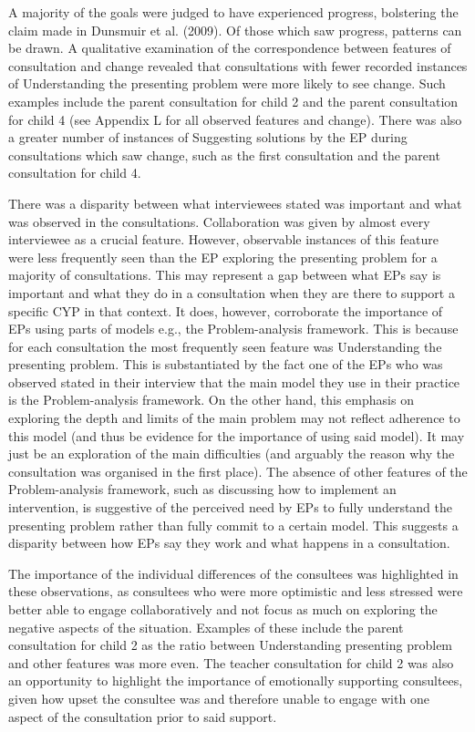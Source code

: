 \documentclass[
  english,
  man,floatsintext]{apa6}
\begin{document}
A majority of the goals were judged to have experienced progress,
bolstering the claim made in Dunsmuir et al. (2009). Of
those which saw progress, patterns can be drawn. A qualitative
examination of the correspondence between features of consultation and
change revealed that consultations with fewer recorded instances of
Understanding the presenting problem were more likely to see change.
Such examples include the parent consultation for child 2 and the parent
consultation for child 4 (see Appendix L for all observed features and
change). There was also a greater number of instances of Suggesting
solutions by the EP during consultations which saw change, such as the
first consultation and the parent consultation for child 4.

There was a disparity between what interviewees stated was important and
what was observed in the consultations. Collaboration was given by
almost every interviewee as a crucial feature. However, observable
instances of this feature were less frequently seen than the EP
exploring the presenting problem for a majority of consultations. This
may represent a gap between what EPs say is important and what they
do in a consultation when they are there to support a specific
CYP in that context. It does, however, corroborate the importance of EPs
using parts of models e.g., the Problem-analysis framework. This is
because for each consultation the most frequently seen feature was
Understanding the presenting problem. This is substantiated by the fact
one of the EPs who was observed stated in their interview that the main
model they use in their practice is the Problem-analysis framework. On
the other hand, this emphasis on exploring the depth and limits of the
main problem may not reflect adherence to this model (and thus be
evidence for the importance of using said model). It may just be an
exploration of the main difficulties (and arguably the reason why the
consultation was organised in the first place). The absence of other
features of the Problem-analysis framework, such as discussing how to
implement an intervention, is suggestive of the perceived need by EPs to
fully understand the presenting problem rather than fully commit to a
certain model. This suggests a disparity between how EPs say they work
and what happens in a consultation.

The importance of the individual differences of the consultees was
highlighted in these observations, as consultees who were more
optimistic and less stressed were better able to engage collaboratively
and not focus as much on exploring the negative aspects of the
situation. Examples of these include the parent consultation for child 2
as the ratio between Understanding presenting problem and other features
was more even. The teacher consultation for child 2 was also an
opportunity to highlight the importance of emotionally supporting
consultees, given how upset the consultee was and therefore unable to
engage with one aspect of the consultation prior to said support.
\end{document}
